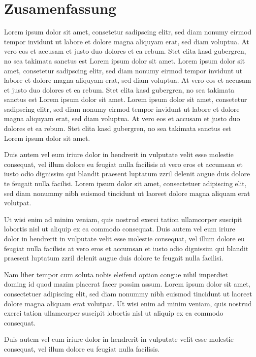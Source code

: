 

\section*{Zusamenfassung}\label{sec:preface_de}

Lorem ipsum dolor sit amet, consetetur sadipscing elitr, sed diam nonumy eirmod tempor invidunt ut labore et dolore magna aliquyam erat, sed diam voluptua. At vero eos et accusam et justo duo dolores et ea rebum. Stet clita kasd gubergren, no sea takimata sanctus est Lorem ipsum dolor sit amet. Lorem ipsum dolor sit amet, consetetur sadipscing elitr, sed diam nonumy eirmod tempor invidunt ut labore et dolore magna aliquyam erat, sed diam voluptua. At vero eos et accusam et justo duo dolores et ea rebum. Stet clita kasd gubergren, no sea takimata sanctus est Lorem ipsum dolor sit amet. Lorem ipsum dolor sit amet, consetetur sadipscing elitr, sed diam nonumy eirmod tempor invidunt ut labore et dolore magna aliquyam erat, sed diam voluptua. At vero eos et accusam et justo duo dolores et ea rebum. Stet clita kasd gubergren, no sea takimata sanctus est Lorem ipsum dolor sit amet.   

Duis autem vel eum iriure dolor in hendrerit in vulputate velit esse molestie consequat, vel illum dolore eu feugiat nulla facilisis at vero eros et accumsan et iusto odio dignissim qui blandit praesent luptatum zzril delenit augue duis dolore te feugait nulla facilisi. Lorem ipsum dolor sit amet, consectetuer adipiscing elit, sed diam nonummy nibh euismod tincidunt ut laoreet dolore magna aliquam erat volutpat.   

Ut wisi enim ad minim veniam, quis nostrud exerci tation ullamcorper suscipit lobortis nisl ut aliquip ex ea commodo consequat. Duis autem vel eum iriure dolor in hendrerit in vulputate velit esse molestie consequat, vel illum dolore eu feugiat nulla facilisis at vero eros et accumsan et iusto odio dignissim qui blandit praesent luptatum zzril delenit augue duis dolore te feugait nulla facilisi.   

Nam liber tempor cum soluta nobis eleifend option congue nihil imperdiet doming id quod mazim placerat facer possim assum. Lorem ipsum dolor sit amet, consectetuer adipiscing elit, sed diam nonummy nibh euismod tincidunt ut laoreet dolore magna aliquam erat volutpat. Ut wisi enim ad minim veniam, quis nostrud exerci tation ullamcorper suscipit lobortis nisl ut aliquip ex ea commodo consequat.   

Duis autem vel eum iriure dolor in hendrerit in vulputate velit esse molestie consequat, vel illum dolore eu feugiat nulla facilisis.   

